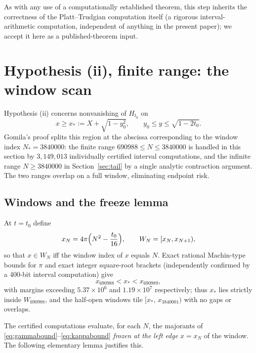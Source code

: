 \documentclass[11pt]{article}
\theoremstyle{definition}
\begin{document}
As with any use of a computationally established theorem, this step
inherits the correctness of the Platt--Trudgian computation itself (a
rigorous interval-arithmetic computation, independent of anything in
the present paper); we accept it here as a published-theorem
input.

\section{Hypothesis (ii), finite range: the window scan}\label{sec:finite}

Hypothesis (ii) concerns nonvanishing of $H_{t_0}$ on
\begin{equation}\label{eq:hypiiregion}
x\ge x_*:=X+\sqrt{1-y_0^2},
\qquad
y_0\le y\le\sqrt{1-2t_0}.
\end{equation}
Gomila's proof splits this region at the abscissa corresponding to
the window index $N_*=3840000$: the finite range
$690988\le N\le3840000$ is handled in this section by
$3{,}149{,}013$ individually certified interval computations, and
the infinite range $N\ge3840000$ in Section~\ref{sec:tail} by a
single analytic contraction argument. The two ranges overlap on a
full window, eliminating endpoint risk.

\subsection{Windows and the freeze lemma}\label{sec:freeze}

At $t=t_0$ define
\[
x_N=4\pi\Bigl(N^2-\frac{t_0}{16}\Bigr),
\qquad
W_N=[x_N,x_{N+1}),
\]
so that $x\in W_N$ iff the window index of $x$ equals $N$. Exact
rational Machin-type bounds for $\pi$ and exact integer square-root
brackets (independently confirmed by a 400-bit interval computation)
give
\begin{equation}\label{eq:xstarwindow}
x_{690988}<x_*<x_{690989},
\end{equation}
with margins exceeding $5.37\times10^6$ and $1.19\times10^7$
respectively; thus $x_*$ lies strictly inside $W_{690988}$, and the
half-open windows tile $[x_*,\,x_{3840001})$ with no gaps or overlaps.

The certified computations evaluate, for each $N$, the majorants of
\eqref{eq:gammabound}--\eqref{eq:kappabound} \emph{frozen at the
left edge} $x=x_N$ of the window.
The following elementary lemma justifies this.
\end{document}
